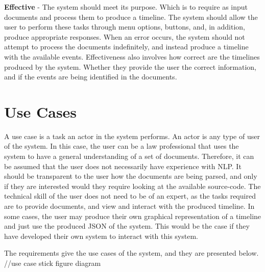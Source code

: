 \par \textbf{Effective} - The system should meet its purpose. Which is to require as input documents and process them to produce a timeline. The system should allow the user to perform these tasks through menu options, buttons, and, in addition, produce appropriate responses. When an error occurs, the system should not attempt to process the documents indefinitely, and instead produce a timeline with the available events. Effectiveness also involves how correct are the timelines produced by the system. Whether they provide the user the correct information, and if the events are being identified in the documents. 

\section{Use Cases}
\par A use case is a task an actor in the system performs. An actor is any type of user of the system. In this case, the user can be a law professional that uses the system to have a general understanding of a set of documents. Therefore, it can be assumed that the user does not necessarily have experience with NLP. It should be transparent to the user how the documents are being parsed, and only if they are interested would they require looking at the available source-code. The technical skill of the user does not need to be of an expert, as the tasks required are to provide documents, and view and interact with the produced timeline. In some cases, the user may produce their own graphical representation of a timeline and just use the produced JSON of the system. This would be the case if they have developed their own system to interact with this system.
\par The requirements give the use cases of the system, and they are presented below. 
//use case stick figure diagram
